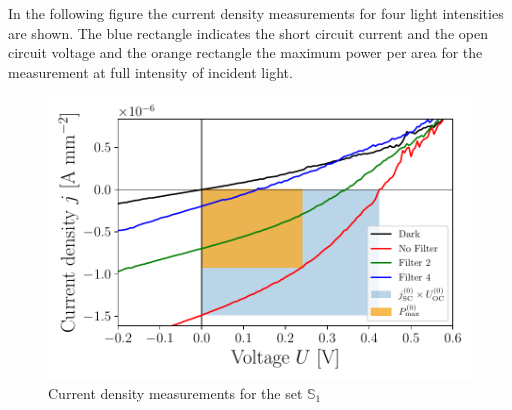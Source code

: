 
In the following figure the current density measurements for four light intensities are shown. The blue rectangle indicates the short circuit current and the open circuit voltage and the orange rectangle the maximum power per area for the measurement at full intensity of incident light.

\begin{figure}[h]\centering
\includegraphics[width=\columnwidth]{../../../IV-Curve-Analysis/OSC1Graph.pdf}
\caption{Current density measurements for the set $\mathbb{S}_1$}
\label{fig:OSC1Graph}
\end{figure}

